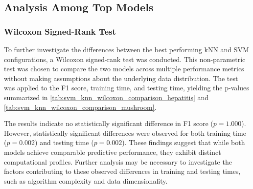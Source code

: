 \subsection{Analysis Among Top Models}
\subsubsection{Wilcoxon Signed-Rank Test}
\label{subsubsection:wilcoxon-results}

To further investigate the differences between the best performing kNN and SVM configurations,
a Wilcoxon signed-rank test was conducted. This non-parametric test was chosen to compare the two models
across multiple performance metrics without making assumptions about the underlying data distribution. 
The test was applied to the F1 score, training time, and testing time, yielding the p-values summarized
in \autoref{tab:svm_knn_wilcoxon_comparison_hepatitis} and \autoref{tab:svm_knn_wilcoxon_comparison_mushroom}.




The results indicate no statistically significant difference in F1 score ($p = 1.000$). 
However, statistically significant differences were observed for both training time ($p = 0.002$) and 
testing time ($p = 0.002$). These findings suggest that while both models achieve comparable predictive
performance, they exhibit distinct computational profiles. Further analysis may be necessary to investigate
the factors contributing to these observed differences in training and testing times, such as algorithm 
complexity and data dimensionality.